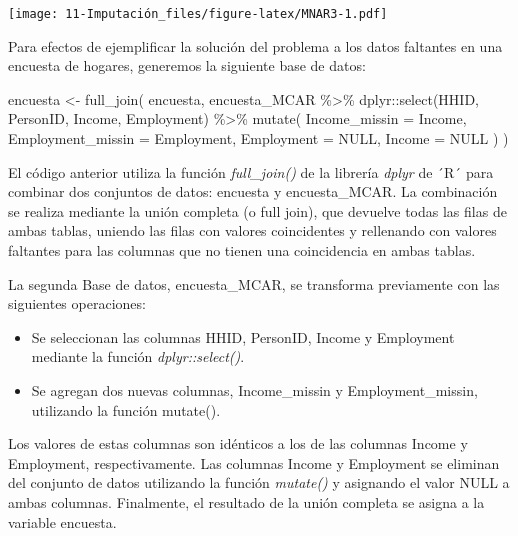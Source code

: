 \documentclass[
  12pt,
]{book}
\newenvironment{Shaded}{\begin{snugshade}}{\end{snugshade}}
\newcommand{\AttributeTok}[1]{\textcolor[rgb]{0.77,0.63,0.00}{#1}}
\newcommand{\ConstantTok}[1]{\textcolor[rgb]{0.00,0.00,0.00}{#1}}
\newcommand{\FunctionTok}[1]{\textcolor[rgb]{0.00,0.00,0.00}{#1}}
\newcommand{\NormalTok}[1]{#1}
\newcommand{\OtherTok}[1]{\textcolor[rgb]{0.56,0.35,0.01}{#1}}
\newcommand{\SpecialCharTok}[1]{\textcolor[rgb]{0.00,0.00,0.00}{#1}}
\begin{document}
\texttt{[image: 11-Imputación\_files/figure-latex/MNAR3-1.pdf]}

Para efectos de ejemplificar la solución del problema a los datos faltantes en una encuesta de hogares, generemos la siguiente base de datos:

\begin{Shaded}
\begin{Highlighting}[]
\NormalTok{encuesta }\OtherTok{\textless{}{-}} \FunctionTok{full\_join}\NormalTok{(}
\NormalTok{  encuesta,}
\NormalTok{  encuesta\_MCAR }\SpecialCharTok{\%\textgreater{}\%} 
\NormalTok{    dplyr}\SpecialCharTok{::}\FunctionTok{select}\NormalTok{(HHID, PersonID, Income, Employment) }\SpecialCharTok{\%\textgreater{}\%}
    \FunctionTok{mutate}\NormalTok{(}
      \AttributeTok{Income\_missin =}\NormalTok{ Income,}
      \AttributeTok{Employment\_missin =}\NormalTok{ Employment,}
      \AttributeTok{Employment =} \ConstantTok{NULL}\NormalTok{,}
      \AttributeTok{Income =} \ConstantTok{NULL}
\NormalTok{    )}
\NormalTok{)}
\end{Highlighting}
\end{Shaded}

El código anterior utiliza la función \emph{full\_join()} de la librería \emph{dplyr} de ´R´ para combinar dos conjuntos de datos: encuesta y encuesta\_MCAR. La combinación se realiza mediante la unión completa (o full join), que devuelve todas las filas de ambas tablas, uniendo las filas con valores coincidentes y rellenando con valores faltantes para las columnas que no tienen una coincidencia en ambas tablas.

La segunda Base de datos, encuesta\_MCAR, se transforma previamente con las siguientes operaciones:

\begin{itemize}
\item
  Se seleccionan las columnas HHID, PersonID, Income y Employment mediante la función \emph{dplyr::select()}.
\item
  Se agregan dos nuevas columnas, Income\_missin y Employment\_missin, utilizando la función mutate().
\end{itemize}

Los valores de estas columnas son idénticos a los de las columnas Income y Employment, respectivamente. Las columnas Income y Employment se eliminan del conjunto de datos utilizando la función \emph{mutate()} y asignando el valor NULL a ambas columnas. Finalmente, el resultado de la unión completa se asigna a la variable encuesta.
\end{document}
